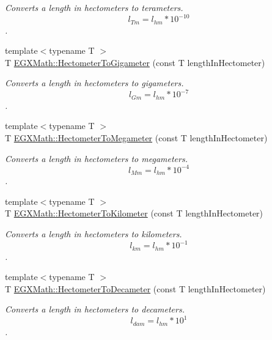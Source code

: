 \begin{DoxyCompactItemize}
\begin{DoxyCompactList}\small\item\em Converts a length in hectometers to terameters. \[ l_{Tm}=l_{hm} * 10^{-10} \]. \end{DoxyCompactList}\item 
{\footnotesize template$<$typename T $>$ }\\T \mbox{\hyperlink{group___e_g_x_math-_conversions-_length_conversions-_s_i-_hectometer-_s_i_ga506846099a8b61bcc3d1cf761dc4cfc5}{E\+G\+X\+Math\+::\+Hectometer\+To\+Gigameter}} (const T length\+In\+Hectometer)
\begin{DoxyCompactList}\small\item\em Converts a length in hectometers to gigameters. \[ l_{Gm}=l_{hm} * 10^{-7} \]. \end{DoxyCompactList}\item 
{\footnotesize template$<$typename T $>$ }\\T \mbox{\hyperlink{group___e_g_x_math-_conversions-_length_conversions-_s_i-_hectometer-_s_i_gab1a836041f9b5851f1b51fa4a09c6791}{E\+G\+X\+Math\+::\+Hectometer\+To\+Megameter}} (const T length\+In\+Hectometer)
\begin{DoxyCompactList}\small\item\em Converts a length in hectometers to megameters. \[ l_{Mm}=l_{hm} * 10^{-4} \]. \end{DoxyCompactList}\item 
{\footnotesize template$<$typename T $>$ }\\T \mbox{\hyperlink{group___e_g_x_math-_conversions-_length_conversions-_s_i-_hectometer-_s_i_ga38aeefced1e25e531c306bae511786bb}{E\+G\+X\+Math\+::\+Hectometer\+To\+Kilometer}} (const T length\+In\+Hectometer)
\begin{DoxyCompactList}\small\item\em Converts a length in hectometers to kilometers. \[ l_{km}=l_{hm} * 10^{-1} \]. \end{DoxyCompactList}\item 
{\footnotesize template$<$typename T $>$ }\\T \mbox{\hyperlink{group___e_g_x_math-_conversions-_length_conversions-_s_i-_hectometer-_s_i_gae1f538c996355305fea9022a6325dab0}{E\+G\+X\+Math\+::\+Hectometer\+To\+Decameter}} (const T length\+In\+Hectometer)
\begin{DoxyCompactList}\small\item\em Converts a length in hectometers to decameters. \[ l_{dam}=l_{hm} * 10^{1} \]. \end{DoxyCompactList}\item 

\end{DoxyCompactItemize}
